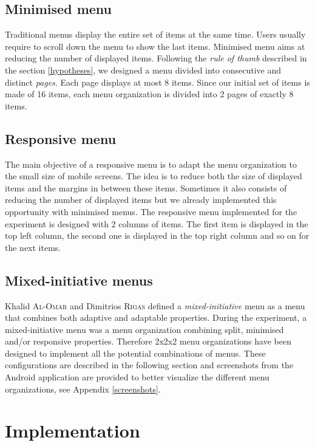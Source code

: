 \subsection{Minimised menu}
Traditional menus display the entire set of items at the same time. Users 
usually require to scroll down the menu to show the last items. Minimised menu 
aims at reducing the number of displayed items. Following the \textit{rule of 
thumb} described in the section \ref{hypotheses}, we designed a menu divided 
into consecutive and distinct \textit{pages}. Each page displays at most 8 
items. Since our initial set of items is made of 16 items, each menu 
organization is divided into 2 pages of exactly 8 items.

\subsection{Responsive menu}
The main objective of a responsive menu is to adapt the menu organization to 
the small size of mobile screens. The idea is to reduce both the size of 
displayed items and the margins in between these items. Sometimes it also 
consists of 
reducing the number of displayed items but we already implemented this 
opportunity with minimised menus. The responsive menu implemented for the 
experiment is designed with 2 columns of items. The first item is displayed in 
the top left column, the second one is displayed in the top right column and so 
on for the next items.

\subsection{Mixed-initiative menus}
Khalid \textsc{Al-Omar} and Dimitrios \textsc{Rigas} defined a 
\textit{mixed-initiative} menu as 
a menu that combines both adaptive and adaptable properties. During the 
experiment, a mixed-initiative menu was a menu organization combining split, 
minimised and/or responsive properties. Therefore 2x2x2 menu organizations have 
been designed to implement all the potential combinations of 
menus. These configurations are described in the following section and 
screenshots from the Android application are provided to better visualize the 
different menu organizations, see Appendix \ref{screenshots}.

\section{Implementation}

